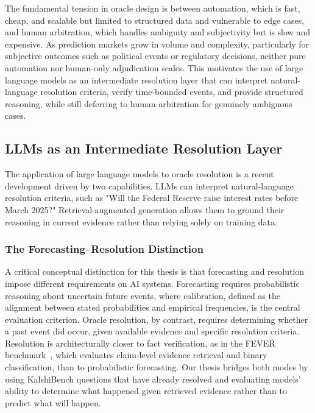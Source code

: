 The fundamental tension in oracle design is between automation, which is fast, cheap, and scalable but limited to structured data and vulnerable to edge cases, and human arbitration, which handles ambiguity and subjectivity but is slow and expensive. As prediction markets grow in volume and complexity, particularly for subjective outcomes such as political events or regulatory decisions, neither pure automation nor human-only adjudication scales. This motivates the use of large language models as an intermediate resolution layer that can interpret natural-language resolution criteria, verify time-bounded events, and provide structured reasoning, while still deferring to human arbitration for genuinely ambiguous cases.

\subsection{LLMs as an Intermediate Resolution Layer}

The application of large language models to oracle resolution is a recent development driven by two capabilities. LLMs can interpret natural-language resolution criteria, such as "Will the Federal Reserve raise interest rates before March 2025?" Retrieval-augmented generation allows them to ground their reasoning in current evidence rather than relying solely on training data.

\subsubsection{The Forecasting--Resolution Distinction}

A critical conceptual distinction for this thesis is that forecasting and resolution impose different requirements on AI systems. Forecasting requires probabilistic reasoning about uncertain future events, where calibration, defined as the alignment between stated probabilities and empirical frequencies, is the central evaluation criterion. Oracle resolution, by contrast, requires determining whether a past event did occur, given available evidence and specific resolution criteria. Resolution is architecturally closer to fact verification, as in the FEVER benchmark~\cite{thorne2018fever}, which evaluates claim-level evidence retrieval and binary classification, than to probabilistic forecasting. Our thesis bridges both modes by using KalshiBench questions that have already resolved and evaluating models' ability to determine what happened given retrieved evidence rather than to predict what will happen.

